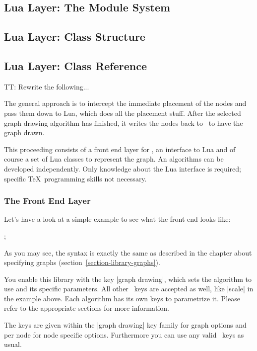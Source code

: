 \subsection{Lua Layer: The Module System}

\subsection{Lua Layer: Class Structure}

\subsection{Lua Layer: Class Reference}




TT: Rewrite the following...


The general approach is to 
intercept the immediate placement of the nodes and pass them down to
Lua, which does all the placement stuff. After the selected graph
drawing algorithm has finished, it writes the nodes back to
\tikzname\ to have the graph drawn.

This proceeding consists of a front end layer for \tikzname, an
interface to Lua and of course a set of Lua classes to represent the
graph. An algorithms can be developed independently. Only knowledge
about the Lua interface is required; specific \TeX\ programming skills
not necessary.

\subsubsection{The Front End Layer}
Let's have a look at a simple example to see what the front end looks
like:

\begin{codeexample}[]
\tikz[AhrensFKSS2011 tree,scale=2]
  ;
\end{codeexample}

As you may see, the syntax is exactly the same as described in the
chapter about specifying graphs (section~\ref{section-library-graphs}).

You enable this library with the key |graph drawing|, which sets the
algorithm to use and its specific parameters. All other
\tikzname\ keys are accepted as well, like |scale| in the example
above. Each algorithm has its own keys to parametrize it. Please refer to
the appropriate sections for more information.

The keys are given within the |graph drawing| key family for graph options and per node for node specific options. Furthermore you can use any valid \tikzname\ keys as usual. 

